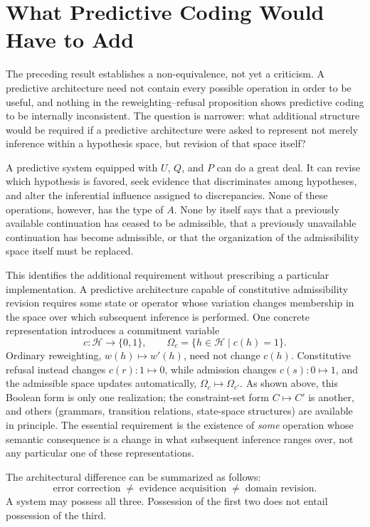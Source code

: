 \documentclass[11pt]{article}
\begin{document}
\section{What Predictive Coding Would Have to Add}

The preceding result establishes a non-equivalence, not yet a criticism. A predictive architecture need not contain every possible operation in order to be useful, and nothing in the reweighting–refusal proposition shows predictive coding to be internally inconsistent. The question is narrower: what additional structure would be required if a predictive architecture were asked to represent not merely inference within a hypothesis space, but revision of that space itself?

A predictive system equipped with $U$, $Q$, and $P$ can do a great deal. It can revise which hypothesis is favored, seek evidence that discriminates among hypotheses, and alter the inferential influence assigned to discrepancies. None of these operations, however, has the type of $A$. None by itself says that a previously available continuation has ceased to be admissible, that a previously unavailable continuation has become admissible, or that the organization of the admissibility space itself must be replaced.

This identifies the additional requirement without prescribing a particular implementation. A predictive architecture capable of constitutive admissibility revision requires some state or operator whose variation changes membership in the space over which subsequent inference is performed. One concrete representation introduces a commitment variable
\[
c : \mathcal{H} \rightarrow \{0,1\}, \qquad \Omega_c = \{h \in \mathcal{H} \mid c(h) = 1\}.
\]
Ordinary reweighting, $w(h) \mapsto w'(h)$, need not change $c(h)$. Constitutive refusal instead changes $c(r) : 1 \mapsto 0$, while admission changes $c(s) : 0 \mapsto 1$, and the admissible space updates automatically, $\Omega_c \mapsto \Omega_{c'}$. As shown above, this Boolean form is only one realization; the constraint-set form $C \mapsto C'$ is another, and others (grammars, transition relations, state-space structures) are available in principle. The essential requirement is the existence of \emph{some} operation whose semantic consequence is a change in what subsequent inference ranges over, not any particular one of these representations.

The architectural difference can be summarized as follows:
\[
\text{error correction} \;\neq\; \text{evidence acquisition} \;\neq\; \text{domain revision}.
\]
A system may possess all three. Possession of the first two does not entail possession of the third.
\end{document}
